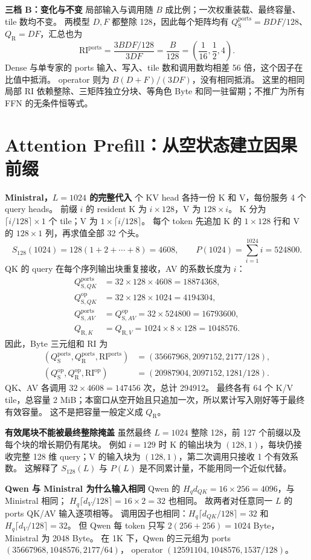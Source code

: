 \documentclass[11pt,a4paper,fontset=fandol]{ctexart}
\newcommand{\qs}{Q_{\mathrm S}}
\newcommand{\qr}{Q_{\mathrm R}}
\newcommand{\RI}{\mathrm{RI}}
\newcommand{\op}{\mathrm{op}}
\newcommand{\loc}{\mathrm{ports}}
\newcommand{\para}[1]{\par\smallskip\noindent\textbf{#1}\quad}
\begin{document}
\para{三档 B：变化与不变}
局部输入与调用随 $B$ 成比例；一次权重装载、最终容量、tile 数均不变。
两模型 $D,F$ 都整除 128，因此每个矩阵均有
$\qs^{\loc}=BDF/128$、$\qr=DF$，汇总也为
\[
\RI^{\loc}=\frac{3BDF/128}{3DF}=\frac B{128}
=\left(\frac1{16},\frac12,4\right).
\]
Dense 与单专家的 ports 输入、写入、tile 数和调用数均相差 56 倍，这个因子在比值中抵消。
operator 则为 $B(D+F)/(3DF)$，没有相同抵消。
这里的相同局部 RI 依赖整除、三矩阵独立分块、等角色 Byte 和同一驻留期；不推广为所有 FFN 的无条件恒等式。

\clearpage
\section{Attention Prefill：从空状态建立因果前缀}
\para{Ministral，$L=1024$ 的完整代入}
8 个 KV head 各持一份 K 和 V，每份服务 4 个 query heads。
前缀 $i$ 的 resident K 为 $i\times128$，V 为 $128\times i$。
K 分为 $\lceil i/128\rceil\times1$ 个 tile；V 为 $1\times\lceil i/128\rceil$。
每个 token 先追加 K 的 $1\times128$ 行和 V 的 $128\times1$ 列，再求值全部 32 个头。
\[
S_{128}(1024)=128(1+2+\cdots+8)=4608,\qquad
P(1024)=\sum_{i=1}^{1024}i=524800.
\]
QK 的 query 在每个序列输出块重复接收，AV 的系数长度为 $i$：
\begin{align*}
Q_{\mathrm S,QK}^{\loc}&=32\times128\times4608=18874368,\\
Q_{\mathrm S,QK}^{\op}&=32\times128\times1024=4194304,\\
Q_{\mathrm S,AV}^{\loc}&=Q_{\mathrm S,AV}^{\op}=32\times524800=16793600,\\
Q_{\mathrm R,K}&=Q_{\mathrm R,V}=1024\times8\times128=1048576.
\end{align*}
因此，Byte 三元组和 RI 为
\begin{align*}
(\qs^{\loc},\qr^{\loc},\RI^{\loc})&=(35667968,2097152,2177/128),\\
(\qs^{\op},\qr^{\op},\RI^{\op})&=(20987904,2097152,1281/128).
\end{align*}
QK、AV 各调用 $32\times4608=147456$ 次，总计 294912。
最终各有 64 个 K/V tile，总容量 2 MiB；本窗口从空开始且只追加一次，所以累计写入刚好等于最终有效容量。
这不是把容量一般定义成 $\qr$。

\para{有效尾块不能被最终整除掩盖}
虽然最终 $L=1024$ 整除 128，前 127 个前缀以及每个块的增长期仍有尾块。
例如 $i=129$ 时 K 的输出块为 $(128,1)$，每块仍接收完整 128 维 query；V 的输入块为 $(128,1)$，第二次调用只接收 1 个有效系数。
这解释了 $S_{128}(L)$ 与 $P(L)$ 是不同累计量，不能用同一个近似代替。

\para{Qwen 与 Ministral 为什么输入相同}
Qwen 的 $H_qd_{QK}=16\times256=4096$，与 Ministral 相同；
$H_q\lceil d_V/128\rceil=16\times2=32$ 也相同。
故两者对任意同一 $L$ 的 ports QK/AV 输入逐项相等。
调用因子也相同：$H_q\lceil d_{QK}/128\rceil=32$ 和
$H_q\lceil d_V/128\rceil=32$。
但 Qwen 每 token 只写 $2(256+256)=1024$ Byte，Ministral 为 2048 Byte。
在 1K 下，Qwen 的三元组为 ports $(35667968,1048576,2177/64)$，
operator $(12591104,1048576,1537/128)$。
\end{document}

